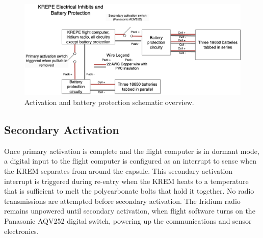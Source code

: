 \documentclass{article}
\begin{document}
\begin{figure}[H]
    \centering
    \includegraphics[width=\textwidth]{images/krepe-electrical-inhibits.png}
    \caption{Activation and battery protection schematic overview.}
    \label{fig:activation-circuitry}
\end{figure}







\subsection{Secondary Activation}
\label{sec:secondary-activation}
Once primary activation is complete and the flight computer is in dormant mode, a digital input to the flight computer is configured as an interrupt to sense when the KREM separates from around the capsule. This secondary activation interrupt is triggered during re-entry when the KREM heats to a temperature that is sufficient to melt the polycarbonate bolts that hold it together. No radio transmissions are attempted before secondary activation. The Iridium radio remains unpowered until secondary activation, when flight software turns on the Panasonic AQV252 digital switch, powering up the  communications and sensor electronics.




\end{document}
